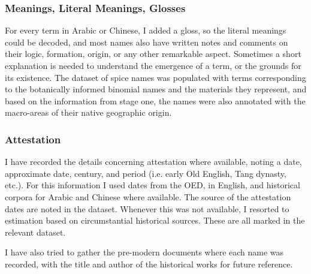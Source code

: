 


\subsubsection{Meanings, Literal Meanings, Glosses}

For every term in Arabic or Chinese, I added a gloss, so the literal meanings could be decoded, and most names also have written notes and comments on their logic, formation, origin, or any other remarkable aspect. Sometimes a short explanation is needed to understand the emergence of a term, or the grounds for its existence. The dataset of spice names was populated with terms corresponding to the botanically informed binomial names and the materials they represent, and based on the information from stage one, the names were also annotated with the macro-areas of their native geographic origin.


\subsubsection{Attestation}

I have recorded the details concerning attestation where available, noting a date, approximate date, century, and period (i.e. early Old English, Tang dynasty, etc.). For this information I used dates from the \gls{OED}, in English, and historical corpora for Arabic and Chinese where available. The source of the attestation dates are noted in the dataset. Whenever this was not available, I resorted to estimation based on circumstantial historical sources. These are all marked in the relevant dataset.

I have also tried to gather the pre-modern documents where each name was recorded, with the title and author of the historical works for future reference. %



